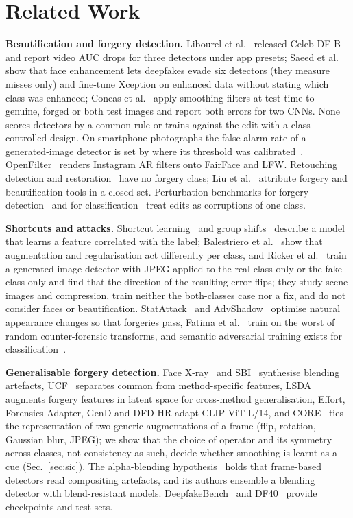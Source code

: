 \documentclass[conference]{IEEEtran}
\begin{document}
\section{Related Work}
\textbf{Beautification and forgery detection.} Libourel et al.~\cite{libourel2024} released Celeb-DF-B and report video AUC
drops for three detectors under app presets; Saeed et al.~\cite{saeed2025} show that face enhancement lets deepfakes evade six
detectors (they measure misses only) and fine-tune Xception on enhanced data without stating which class was enhanced; Concas et al.~\cite{concas2025} apply smoothing filters at test time to genuine, forged or both test images and report both
errors for two CNNs. None scores detectors by a common rule or trains against the edit with a class-controlled design. On smartphone
photographs the false-alarm rate of a generated-image detector is set by where its threshold was
calibrated~\cite{laionmobile2026}. OpenFilter~\cite{openfilter2022} renders Instagram AR filters onto FairFace and LFW.
Retouching detection and restoration~\cite{bharati2016,jain2018,wang2019photoshop,
retouchingffhq,frrffusion,mofrr,reface} have no forgery class; Liu et al.~\cite{miea2026} attribute forgery and beautification
tools in a closed set. Perturbation benchmarks for forgery detection~\cite{deeperforensics2020,moire2025} and for
classification~\cite{hendrycks2019} treat edits as corruptions of one class.

\textbf{Shortcuts and attacks.} Shortcut learning~\cite{geirhos2020} and group shifts~\cite{sagawa2020} describe a model that
learns a feature correlated with the label; Balestriero et al.~\cite{balestriero2022} show that augmentation and regularisation
act differently per class, and Ricker et al.~\cite{ricker2026biasid} train a generated-image detector with JPEG applied to the
real class only or the fake class only and find that the direction of the resulting error flips; they study scene images and
compression, train neither the both-classes case nor a fix, and do not consider faces or beautification. StatAttack~\cite{statattack2023} and AdvShadow~\cite{advshadow2024} optimise natural appearance
changes so that forgeries pass, Fatima et al.~\cite{fatima2025} train on the worst of random counter-forensic transforms, and
semantic adversarial training exists for classification~\cite{hosseini2018,laidlaw2019,gat2023,ava2021}.

\textbf{Generalisable forgery detection.} Face X-ray~\cite{facexray} and SBI~\cite{sbi} synthesise blending artefacts,
UCF~\cite{ucf} separates common from method-specific features, LSDA~\cite{lsda} augments forgery features in latent space for
cross-method generalisation, Effort, Forensics Adapter, GenD and DFD-HR adapt CLIP ViT-L/14, and CORE~\cite{core} ties the representation of two generic augmentations of a frame (flip, rotation, Gaussian blur, JPEG); we show that the choice of operator and its symmetry across classes, not consistency as such, decide whether smoothing is learnt as a cue (Sec.~\ref{sec:sic}). The alpha-blending
hypothesis~\cite{alphablend2026} holds that frame-based detectors read compositing artefacts, and its authors ensemble a
blending detector with blend-resistant models. DeepfakeBench~\cite{deepfakebench} and DF40~\cite{df40} provide checkpoints and
test sets.
\end{document}
